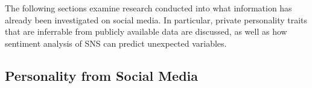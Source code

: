 The following sections examine research conducted into what information has already been investigated on social media. In particular, private personality traits that are inferrable from publicly available data are discussed, as well as how sentiment analysis of SNS can predict unexpected variables. 



\subsection{Personality from Social Media}

